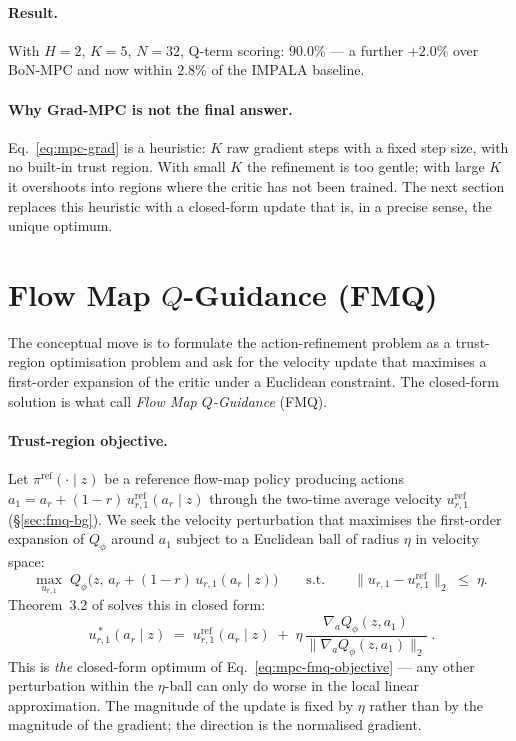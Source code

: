 \paragraph{Result.}
With $H = 2$, $K = 5$, $N = 32$, Q-term scoring: $90.0\%$ --- a further
$+2.0\%$ over BoN-MPC and now within $2.8\%$ of the IMPALA baseline.

\paragraph{Why Grad-MPC is not the final answer.}
Eq.~\eqref{eq:mpc-grad} is a heuristic: $K$ raw gradient steps with a
fixed step size, with no built-in trust region. With small $K$ the
refinement is too gentle; with large $K$ it overshoots into regions
where the critic has not been trained. The next section replaces this
heuristic with a closed-form update that is, in a precise sense, the
unique optimum.

\section{Flow Map $Q$-Guidance (FMQ)}
\label{sec:mpc-fmq}

The conceptual move is to formulate the action-refinement problem as a
trust-region optimisation problem and ask for the velocity update that
maximises a first-order expansion of the critic under a Euclidean
constraint. The closed-form solution is what \cite{ziakas2026aligning}
call \emph{Flow Map $Q$-Guidance} (FMQ).

\paragraph{Trust-region objective.}
Let $\pi^{\mathrm{ref}}(\cdot \mid z)$ be a reference flow-map policy
producing actions $a_1 = a_r + (1-r)\,u^{\mathrm{ref}}_{r,1}(a_r \mid z)$
through the two-time average velocity $u^{\mathrm{ref}}_{r,1}$
(\S\ref{sec:fmq-bg}). We seek the velocity perturbation that maximises
the first-order expansion of $Q_\phi$ around $a_1$ subject to a
Euclidean ball of radius $\eta$ in velocity space:
\begin{equation}
    \max_{u_{r,1}}\; Q_\phi\!\big(z,\, a_r + (1-r)\, u_{r,1}(a_r \mid z)\big)
    \qquad\text{s.t.}\qquad
    \big\|u_{r,1} - u^{\mathrm{ref}}_{r,1}\big\|_2 \;\le\; \eta.
    \label{eq:mpc-fmq-objective}
\end{equation}
Theorem~3.2 of \cite{ziakas2026aligning} solves this in closed form:
\begin{equation}
    \boxed{\;u^{\,*}_{r,1}(a_r \mid z) \;=\; u^{\mathrm{ref}}_{r,1}(a_r \mid z) \;+\; \eta\,\frac{\nabla_a Q_\phi(z, a_1)}{\big\|\nabla_a Q_\phi(z, a_1)\big\|_2}\;.}
    \label{eq:mpc-fmq-target}
\end{equation}
This is \emph{the} closed-form optimum of
Eq.~\eqref{eq:mpc-fmq-objective} --- any other perturbation within the
$\eta$-ball can only do worse in the local linear approximation.
The magnitude of the update is fixed by $\eta$ rather than by the
magnitude of the gradient; the direction is the normalised gradient.


